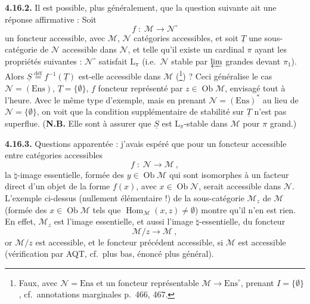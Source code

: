 \documentclass[11pt]{article}
\newcommand{\msp}[1]{\marginpar{\footnotesize [#1]}}
\newcommand{\Hom}{\operatorname{Hom}}
\newcommand{\Ob}{\operatorname{Ob}}
\newcommand{\Ens}{\mathrm{Ens}}
\newcommand{\defeq}{\overset{\text{déf}}{=}}
\begin{document}
\textbf{4.16.2.} Il est possible, plus généralement, que la question suivante ait une réponse affirmative : Soit
\[
f \;:\; \mathcal{M} \longrightarrow \mathcal{N}^\circ
\]
un foncteur accessible, avec $\mathcal{M}$, $\mathcal{N}$ catégories accessibles, et soit $\underline{T}$ une sous-catégorie de $\mathcal{N}$ accessible dans $\mathcal{N}$, et telle qu'il existe un cardinal $\pi$ ayant les propriétés suivantes : $\mathcal{N}^\circ$ satisfait $\mathrm{L}_\pi$ (i.e.\ $\mathcal{N}$ stable par $\varprojlim$ grandes devant $\pi_1$). Alors $\underline{S} \defeq f^{-1}(\underline{T})$ est-elle accessible dans $\mathcal{M}$ (\footnote[191]{Faux, avec $\mathcal{N} = \Ens$ et un foncteur représentable $\mathcal{M} \longrightarrow \Ens^\circ$, prenant $I = \{\emptyset\}$, cf.\ annotations marginales p.~466, 467.}) ? Ceci généralise le cas $\mathcal{N} = (\Ens)$, $\underline{T} = \{\emptyset\}$, $f$ foncteur représenté par $z \in \Ob\mathcal{M}$, envisagé tout à l'heure. Avec le même type d'exemple, mais en prenant $\mathcal{N} = (\Ens)^*$
\msp{469}
au lieu de $\mathcal{N} = \{\emptyset\}$, on voit que la condition supplémentaire de stabilité sur $\underline{T}$ n'est pas
superflue. (\textbf{N.B.} Elle sont à assurer que $\underline{S}$ est $\mathrm{L}_\pi$-stable dans $\mathcal{M}$ pour $\pi$ grand.) %

\textbf{4.16.3.} Questions apparentée : j'avais espéré que pour un foncteur accessible entre catégories accessibles %
\[
f \;:\; \mathcal{N} \longrightarrow \mathcal{M}\ ,
\]
la $\natural$-image essentielle, formée des $y \in \Ob\mathcal{M}$ qui sont isomorphes à un facteur direct d'un objet de la forme $f(x)$, avec $x \in \Ob\mathcal{N}$, serait accessible dans $\mathcal{N}$. L'exemple ci-dessus (nullement élémentaire !) de la sous-catégorie $\mathcal{M}_z$ de $\mathcal{M}$ (formée des $x \in \Ob\mathcal{M}$ tels que $\Hom_{\mathcal{M}}(x,z) \neq \emptyset$) montre qu'il n'en est rien. En effet, $\mathcal{M}_z$ est l'image essentielle, et aussi l'image $\natural$-essentielle, du foncteur
\[
\mathcal{M}/z \longrightarrow \mathcal{M}\ ,
\]
or $\mathcal{M}/z$ est accessible, et le foncteur précédent accessible, si $\mathcal{M}$ est accessible (vérification par AQT, cf.\ plus bas, énoncé plus général).

\msp{470}
\end{document}
